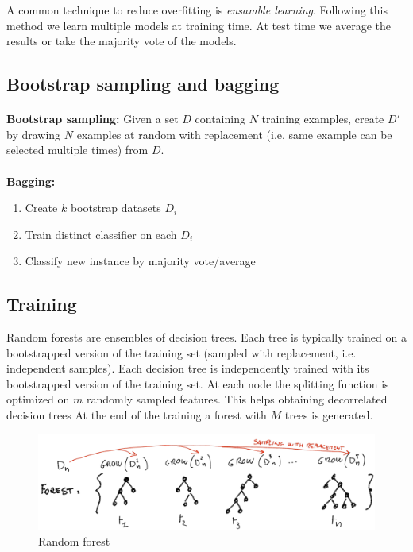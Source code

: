 A common technique to reduce overfitting is \textit{ensamble learning}. Following this method we learn multiple models at training time. At test time we average the results or take the majority vote of the models.

\subsection{Bootstrap sampling and bagging}
\paragraph{}
\textbf{Bootstrap sampling:} Given a set $D$ containing $N$ training examples, create $D'$
by drawing $N$ examples at random with replacement (i.e. same example can be selected multiple times) from $D$.
\paragraph{}
\textbf{Bagging:}
\begin{enumerate}
    \item Create $k$ bootstrap datasets $D_i$
    \item Train distinct classifier on each $D_i$
    \item Classify new instance by majority vote/average
\end{enumerate}

\subsection{Training}
Random forests are ensembles of decision trees. Each tree is typically trained on a bootstrapped version of the training set (sampled
with replacement, i.e. independent samples).
Each decision tree is independently trained with its bootstrapped version of the training set. At each node the splitting function is optimized on $m$ randomly sampled features. This helps obtaining decorrelated decision trees
At the end of the training a forest with $M$ trees is generated.
\begin{figure}
    \centering
    \includegraphics[width=\textwidth]{images/ricci_randomForest.png}
    \caption{Random forest}
    \label{rf}
\end{figure}

